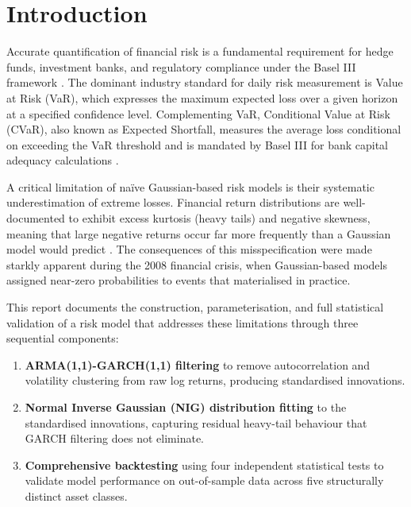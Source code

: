 \documentclass[12pt, a4paper]{article}
\begin{document}
\tableofcontents
\newpage

\section{Introduction}

Accurate quantification of financial risk is a fundamental 
requirement for hedge funds, investment banks, and regulatory 
compliance under the Basel III framework 
\citep{basel3}. The dominant industry standard for daily risk 
measurement is Value at Risk (VaR), which expresses the maximum 
expected loss over a given horizon at a specified confidence level. 
Complementing VaR, Conditional Value at Risk (CVaR), also known as 
Expected Shortfall, measures the average loss conditional on 
exceeding the VaR threshold and is mandated by Basel III for 
bank capital adequacy calculations \citep{rockafellar2000}.

A critical limitation of na\"{i}ve Gaussian-based risk models is 
their systematic underestimation of extreme losses. Financial return 
distributions are well-documented to exhibit excess kurtosis 
(heavy tails) and negative skewness, meaning that large negative 
returns occur far more frequently than a Gaussian model would predict 
\citep{mcneil2015}. The consequences of this misspecification were 
made starkly apparent during the 2008 financial crisis, when 
Gaussian-based models assigned near-zero probabilities to events 
that materialised in practice.

This report documents the construction, parameterisation, and 
full statistical validation of a risk model that addresses these 
limitations through three sequential components:

\begin{enumerate}
  \item \textbf{ARMA(1,1)-GARCH(1,1) filtering} 
        \citep{engle1982, bollerslev1986} to remove autocorrelation 
        and volatility clustering from raw log returns, producing 
        standardised innovations.
  \item \textbf{Normal Inverse Gaussian (NIG) distribution fitting} 
        \citep{barndorff1997} to the standardised innovations, 
        capturing residual heavy-tail behaviour that GARCH filtering 
        does not eliminate.
  \item \textbf{Comprehensive backtesting} using four independent 
        statistical tests \citep{kupiec1995, christoffersen1998, 
        anderson1952} to validate model performance on out-of-sample 
        data across five structurally distinct asset classes.
\end{enumerate}
\end{document}
